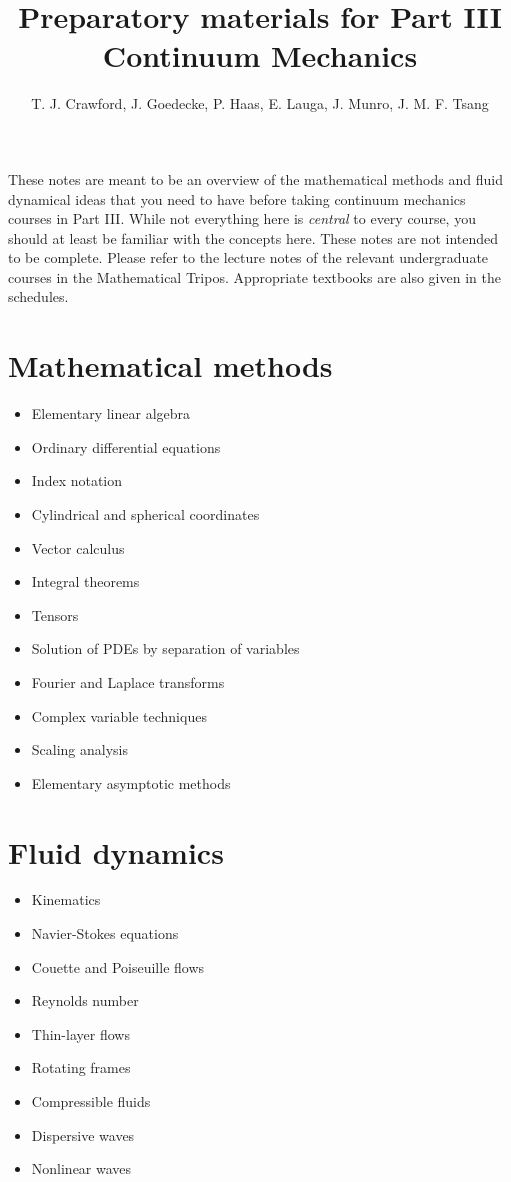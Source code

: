\documentclass{article}
\title{Preparatory materials for Part III Continuum Mechanics}
\author{T. J. Crawford, J. Goedecke, P. Haas, E. Lauga, J. Munro, J. M. F. Tsang}
\begin{document}
\maketitle

These notes are meant to be an overview of the mathematical methods and fluid
dynamical ideas that you need to have before taking continuum mechanics courses
in Part III. While not everything here is \textit{central} to every course, you
should at least be familiar with the concepts here.
These notes are not intended to be complete. Please refer to the lecture notes
of the relevant undergraduate courses in the Mathematical Tripos. Appropriate
textbooks are also given in the schedules. 

\section{Mathematical methods}
\begin{itemize}
    \item Elementary linear algebra
    \item Ordinary differential equations
    \item Index notation
    \item Cylindrical and spherical coordinates 
    \item Vector calculus
    \item Integral theorems 
    \item Tensors 
    \item Solution of PDEs by separation of variables 
    \item Fourier and Laplace transforms 
    \item Complex variable techniques 
    \item Scaling analysis 
    \item Elementary asymptotic methods 
\end{itemize}

\section{Fluid dynamics}
\begin{itemize}
    \item Kinematics 
    \item Navier-Stokes equations 
    \item Couette and Poiseuille flows 
    \item Reynolds number 
    \item Thin-layer flows 
    \item Rotating frames 
    \item Compressible fluids 
    \item Dispersive waves 
    \item Nonlinear waves 
\end{itemize}
\end{document}
